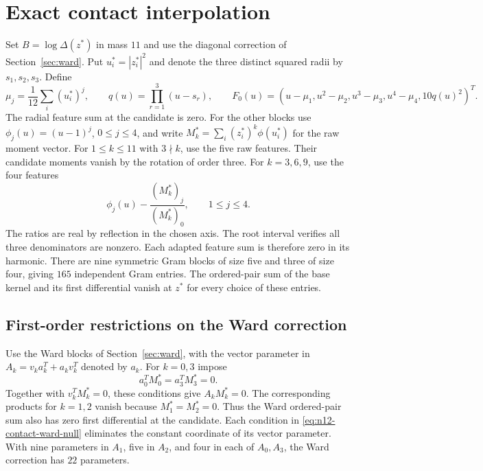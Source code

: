 \documentclass[11pt,letterpaper]{article}
\theoremstyle{remark}
\begin{document}
\section{Exact contact interpolation}
\label{sec:contacts}

Set $B=\log\Delta(z^*)$ in mass $11$ and use the diagonal correction of Section~\ref{sec:ward}. Put $u_i^*=|z_i^*|^2$ and denote the three distinct squared radii by $s_1,s_2,s_3$. Define
\[
 \mu_j=\frac1{12}\sum_i(u_i^*)^j,\qquad
 q(u)=\prod_{r=1}^3(u-s_r),\qquad
 F_0(u)=(u-\mu_1,u^2-\mu_2,u^3-\mu_3,u^4-\mu_4,10q(u)^2)^T.
\]
The radial feature sum at the candidate is zero. For the other blocks use $\phi_j(u)=(u-1)^j$, $0\le j\le4$, and write $M_k^*=\sum_i(z_i^*)^k\phi(u_i^*)$ for the raw moment vector. For $1\le k\le11$ with $3\nmid k$, use the five raw features. Their candidate moments vanish by the rotation of order three. For $k=3,6,9$, use the four features
\[
 \phi_j(u)-\frac{(M_k^*)_j}{(M_k^*)_0},\qquad 1\le j\le4.
\]
The ratios are real by reflection in the chosen axis. The root interval verifies all three denominators are nonzero. Each adapted feature sum is therefore zero in its harmonic. There are nine symmetric Gram blocks of size five and three of size four, giving $165$ independent Gram entries. The ordered-pair sum of the base kernel and its first differential vanish at $z^*$ for every choice of these entries.

\subsection{First-order restrictions on the Ward correction}

Use the Ward blocks of Section~\ref{sec:ward}, with the vector parameter in $A_k=v_k a_k^T+a_k v_k^T$ denoted by $a_k$. For $k=0,3$ impose
\begin{equation}
 a_0^TM_0^*=a_3^TM_3^*=0.
 \label{eq:n12-contact-ward-null}
\end{equation}
Together with $v_k^TM_k^*=0$, these conditions give $A_kM_k^*=0$. The corresponding products for $k=1,2$ vanish because $M_1^*=M_2^*=0$. Thus the Ward ordered-pair sum also has zero first differential at the candidate. Each condition in \eqref{eq:n12-contact-ward-null} eliminates the constant coordinate of its vector parameter. With nine parameters in $A_1$, five in $A_2$, and four in each of $A_0,A_3$, the Ward correction has $22$ parameters.
\end{document}
